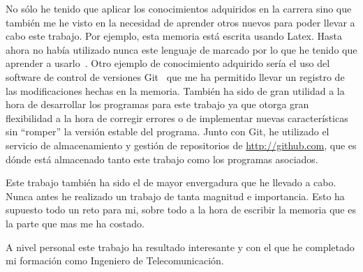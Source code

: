 
No sólo he tenido que aplicar los conocimientos adquiridos en la carrera sino que también me he visto en la necesidad de aprender otros nuevos para poder llevar a cabo este trabajo. Por ejemplo, esta memoria está escrita usando Latex. Hasta ahora no había utilizado nunca este lenguaje de marcado por lo que he tenido que aprender a usarlo~\cite{website:latex-wikibooks}. Otro ejemplo de conocimiento adquirido sería el uso del software de control de versiones Git~\cite{git} que me ha permitido llevar un registro de las modificaciones hechas en la memoria. También ha sido de gran utilidad a la hora de desarrollar los programas para este trabajo ya que otorga gran flexibilidad a la hora de corregir errores o de implementar nuevas características sin “romper” la versión estable del programa. Junto con Git, he utilizado el servicio de almacenamiento y gestión de repositorios de \url{http://github.com}, que es dónde está almacenado tanto este trabajo como los programas asociados.

Este trabajo también ha sido el de mayor envergadura que he llevado a cabo. Nunca antes he realizado un trabajo de tanta magnitud e importancia. Esto ha supuesto todo un reto para mi, sobre todo a la hora de escribir la memoria que es la parte que mas me ha costado.

A nivel personal este trabajo ha resultado interesante y con el que he completado mi formación como Ingeniero de Telecomunicación.
